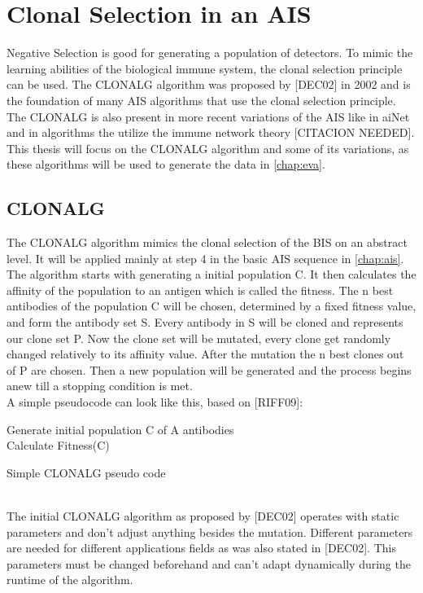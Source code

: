 \section{Clonal Selection in an AIS}
Negative Selection is good for generating a population of detectors. To mimic the learning abilities of the biological immune system, the clonal selection principle can be used. The CLONALG algorithm was proposed by [DEC02] in 2002 and is the foundation of many AIS algorithms that use the clonal selection principle. The CLONALG is also present in more recent variations of the AIS like in aiNet and in algorithms the utilize the immune network theory [CITACION NEEDED]. This thesis will focus on the CLONALG algorithm and some of its variations, as these algorithms will be used to generate the data in \ref{chap:eva}.
\subsection{CLONALG}
The CLONALG algorithm mimics the clonal selection of the BIS on an abstract level. It will be applied mainly at step 4 in the basic AIS sequence in \ref{chap:ais}. The algorithm starts with generating a initial population C. It then calculates the affinity of the population to an antigen which is called the fitness. The n best antibodies of the population C will be chosen, determined by a fixed fitness value, and form the antibody set S. Every antibody in S will be cloned and represents our clone set P. Now the clone set will be mutated, every clone get randomly changed relatively to its affinity value. After the mutation the n best clones out of P are chosen. Then a new population will be generated and the process begins anew till a stopping condition is met.\\
A simple pseudocode can look like this, based on [RIFF09]:
\begin{algorithm}
	Generate initial population C of A antibodies\\
	Calculate Fitness(C)\\
	\caption{Simple CLONALG pseudo code}
\end{algorithm}\\
The initial CLONALG algorithm as proposed by [DEC02] operates with static parameters and don't adjust anything besides the mutation. Different parameters are needed for different applications fields as was also stated in [DEC02]. This parameters must be changed beforehand and can't adapt dynamically during the runtime of the algorithm.
